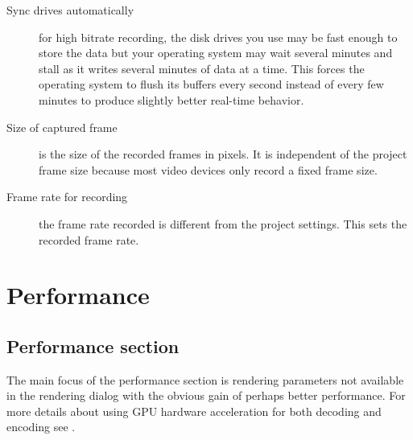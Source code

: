 \begin{description}
    \item[Sync drives automatically] for high bitrate recording, the disk drives you use may be fast enough to store the data but your operating system may wait several minutes and stall as it writes several minutes of data at a time. This forces the operating system to flush its buffers every second instead of every few minutes to produce slightly better real-time behavior.
    \item[Size of captured frame] is the size of the recorded frames in pixels. It is independent of the project frame size because most video devices only record a fixed frame size.
    \item[Frame rate for recording ] the frame rate recorded is different from the project settings. This sets the recorded frame rate.
\end{description}

\section{Performance}%
\label{sec:performance}

\subsection{Performance section}%
\label{sub:performance_section}

The main focus of the performance section is rendering parameters not available in the rendering dialog with the obvious gain of perhaps better performance. For more details about using GPU hardware acceleration for both decoding and encoding see .


